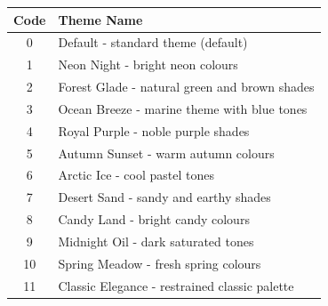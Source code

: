 \documentclass[a4paper,12pt]{article}
\begin{document}
\begin{center}
\begin{tabular}{|c|l|}
\hline
\textbf{Code} & \textbf{Theme Name} \\ \hline
    0 & Default - standard theme (default) \\
    1 & Neon Night - bright neon colours \\
    2 & Forest Glade - natural green and brown shades \\
    3 & Ocean Breeze - marine theme with blue tones \\
    4 & Royal Purple - noble purple shades \\
    5 & Autumn Sunset - warm autumn colours \\
    6 & Arctic Ice - cool pastel tones \\
    7 & Desert Sand - sandy and earthy shades \\
    8 & Candy Land - bright candy colours \\
    9 & Midnight Oil - dark saturated tones \\
    10 & Spring Meadow - fresh spring colours \\
    11 & Classic Elegance - restrained classic palette \\
\hline
\end{tabular}
\end{center}
\end{document}

